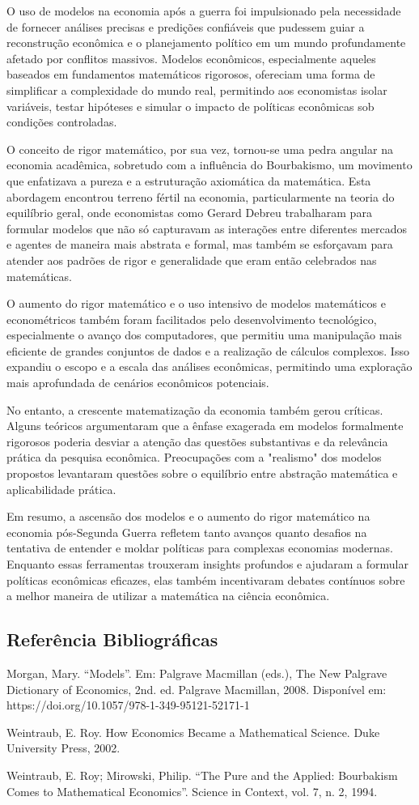 \documentclass[a4paper,12pt]{article}[abntex2]
\begin{document}
O uso de modelos na economia após a guerra foi impulsionado pela necessidade de fornecer análises precisas e predições confiáveis que pudessem guiar a reconstrução econômica e o planejamento político em um mundo profundamente afetado por conflitos massivos. Modelos econômicos, especialmente aqueles baseados em fundamentos matemáticos rigorosos, ofereciam uma forma de simplificar a complexidade do mundo real, permitindo aos economistas isolar variáveis, testar hipóteses e simular o impacto de políticas econômicas sob condições controladas.

O conceito de rigor matemático, por sua vez, tornou-se uma pedra angular na economia acadêmica, sobretudo com a influência do Bourbakismo, um movimento que enfatizava a pureza e a estruturação axiomática da matemática. Esta abordagem encontrou terreno fértil na economia, particularmente na teoria do equilíbrio geral, onde economistas como Gerard Debreu trabalharam para formular modelos que não só capturavam as interações entre diferentes mercados e agentes de maneira mais abstrata e formal, mas também se esforçavam para atender aos padrões de rigor e generalidade que eram então celebrados nas matemáticas.

O aumento do rigor matemático e o uso intensivo de modelos matemáticos e econométricos também foram facilitados pelo desenvolvimento tecnológico, especialmente o avanço dos computadores, que permitiu uma manipulação mais eficiente de grandes conjuntos de dados e a realização de cálculos complexos. Isso expandiu o escopo e a escala das análises econômicas, permitindo uma exploração mais aprofundada de cenários econômicos potenciais.

No entanto, a crescente matematização da economia também gerou críticas. Alguns teóricos argumentaram que a ênfase exagerada em modelos formalmente rigorosos poderia desviar a atenção das questões substantivas e da relevância prática da pesquisa econômica. Preocupações com a "realismo" dos modelos propostos levantaram questões sobre o equilíbrio entre abstração matemática e aplicabilidade prática.

Em resumo, a ascensão dos modelos e o aumento do rigor matemático na economia pós-Segunda Guerra refletem tanto avanços quanto desafios na tentativa de entender e moldar políticas para complexas economias modernas. Enquanto essas ferramentas trouxeram insights profundos e ajudaram a formular políticas econômicas eficazes, elas também incentivaram debates contínuos sobre a melhor maneira de utilizar a matemática na ciência econômica.

\subsection{\textbf{Referência Bibliográficas}}
Morgan, Mary. “Models”. Em: Palgrave Macmillan (eds.), The New Palgrave Dictionary of
Economics, 2nd. ed. Palgrave Macmillan, 2008. Disponível em: https://doi.org/10.1057/978-1-349-95121-52171-1

Weintraub, E. Roy. How Economics Became a Mathematical Science. Duke University Press,
2002.

Weintraub, E. Roy; Mirowski, Philip. “The Pure and the Applied: Bourbakism Comes to
Mathematical Economics”. Science in Context, vol. 7, n. 2, 1994.
\end{document}

